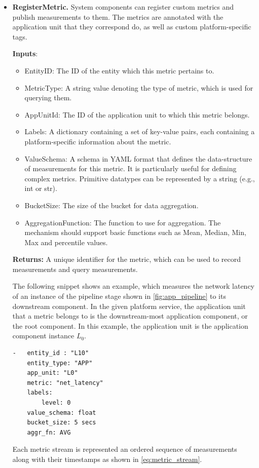 \begin{itemize}
\item \textbf{RegisterMetric.} System components can register custom metrics and publish measurements to them. The metrics are annotated with the application unit that they correspond do, as well as custom platform-specific tags. 
\par \noindent \textbf{Inputs}:
\begin{itemize}
\item EntityID: The ID of the entity which this metric pertains to.
\item MetricType: A string value denoting the type of metric, which is used for querying them.
\item AppUnitId: The ID of the application unit to which this metric belongs.
\item Labels: A dictionary containing a set of key-value pairs, each containing a platform-specific information about the metric.
\item ValueSchema: A schema in YAML format that defines the data-structure of measurements for this metric. It is particularly useful for defining complex metrics. Primitive datatypes can be represented by a string (e.g., int or str).
\item BucketSize: The size of the bucket for data aggregation.
\item AggregationFunction: The function to use for aggregation. The mechanism should support basic functions such as Mean, Median, Min, Max and percentile values.
\end{itemize}
\par \noindent \textbf{Returns: } A unique identifier for the metric, which can be used to record measurements and query measurements.
\par The following snippet shows an example, which measures the network latency of an instance of the pipeline stage shown in \cref{fig:app_pipeline} to its downstream component. In the given platform service, the application unit that a metric belongs to is the downstream-most application component, or the root component. In this example, the application unit is the application component instance $L_0$. 
\begin{verbatim}
-   entity_id : "L10"
    entity_type: "APP"
    app_unit: "L0"
    metric: "net_latency"
    labels:
        level: 0
    value_schema: float
    bucket_size: 5 secs
    aggr_fn: AVG
\end{verbatim}
Each metric stream is represented an ordered sequence of measurements along with their timestamps as shown in \cref{eq:metric_stream}.

\end{itemize}
